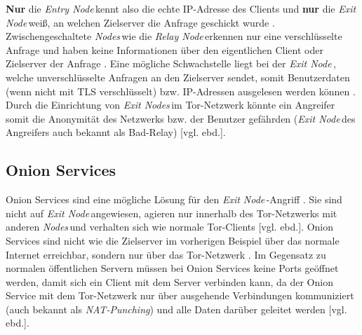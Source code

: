 \documentclass[a4paper,ngerman, headheight=28pt,12pt]{scrartcl}
\newcommand{\vcite}[1]{\cite[vgl.][]{#1}}
\newcommand{\vebd}{[vgl. ebd.]}
\newcommand{\entryn}{\textit{Entry Node\,}}
\newcommand{\relayn}{\textit{Relay Node\,}}
\newcommand{\exitn}{\textit{Exit Node\,}}
\newcommand{\exitns}{\textit{Exit Nodes\,}}
\newcommand{\nodes}{\textit{Nodes\,}}
\begin{document}
\textbf{Nur} die \entryn kennt also die echte IP-Adresse des Clients und \textbf{nur} die \exitn weiß, an welchen Zielserver die Anfrage geschickt wurde \vcite{TorStructure}. Zwischengeschaltete \nodes wie die \relayn erkennen nur eine verschlüsselte Anfrage und haben keine Informationen über den eigentlichen Client oder Zielserver der Anfrage \vcite{EEFTor}.
Eine mögliche Schwachstelle liegt bei der \exitn, welche unverschlüsselte Anfragen an den Zielserver sendet, somit Benutzerdaten (wenn nicht mit TLS verschlüsselt) bzw. IP-Adressen ausgelesen werden können \vcite{TorBadRelay}. Durch die Einrichtung von \exitns im Tor-Netzwerk könnte ein Angreifer somit die Anonymität des Netzwerks bzw. der Benutzer gefährden (\exitn des Angreifers auch bekannt als Bad-Relay) \vebd.

\subsection{Onion Services}
Onion Services sind eine mögliche Lösung für den \exitn-Angriff \vcite{TorOnionServiceTalk}. Sie sind nicht auf \exitn angewiesen, agieren nur innerhalb des Tor-Netzwerks mit anderen \nodes und verhalten sich wie normale Tor-Clients \vebd. Onion Services sind nicht wie die Zielserver im vorherigen Beispiel über das normale Internet erreichbar, sondern nur über das Tor-Netzwerk \vcite{TorOnionService}. Im Gegensatz zu normalen öffentlichen Servern müssen bei Onion Services keine Ports geöffnet werden, damit sich ein Client mit dem Server verbinden kann, da der Onion Service mit dem Tor-Netzwerk nur über ausgehende Verbindungen kommuniziert (auch bekannt als \textit{NAT-Punching}) und alle Daten darüber geleitet werden \vebd.
\end{document}
